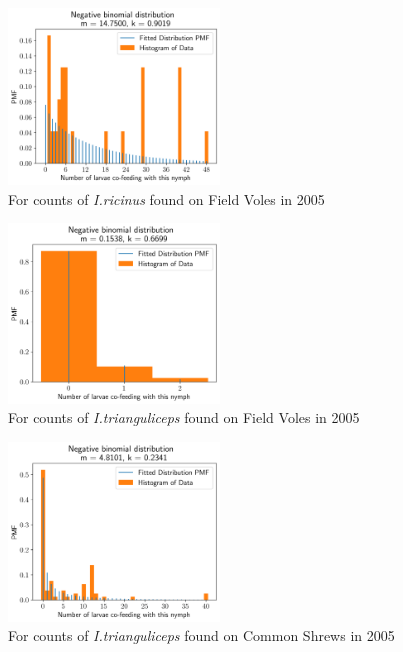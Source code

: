 \documentclass{article}
\begin{document}
\begin{figure}[]
	\begin{mdframed}[backgroundcolor=grey250,rightline=false,leftline=false,topline=false]
	\includegraphics[width=0.5\textwidth, center]{coaggregation_dist_2005_I.ricinus_FV.png}
	\caption{For counts of \textit{I.ricinus} found on Field Voles in 2005}\label{fig:distFit_2005_Iricinus_FV}
	\end{mdframed}
\end{figure}

\begin{figure}[]
	\begin{mdframed}[backgroundcolor=grey250,rightline=false,leftline=false,topline=false]
	\includegraphics[width=0.5\textwidth, center]{coaggregation_dist_2005_I.trianguliceps_FV.png}
	\caption{For counts of \textit{I.trianguliceps} found on Field Voles in 2005}\label{fig:distFit_2005_Itrianguliceps_FV}
	\end{mdframed}
\end{figure}

\begin{figure}[]
	\begin{mdframed}[backgroundcolor=grey250,rightline=false,leftline=false,topline=false]
	\includegraphics[width=0.5\textwidth, center]{coaggregation_dist_2005_I.trianguliceps_SA.png}
	\caption{For counts of \textit{I.trianguliceps} found on Common Shrews in 2005}\label{fig:distFit_2005_Itrianguliceps_SA}
	\end{mdframed}
\end{figure}
\end{document}

